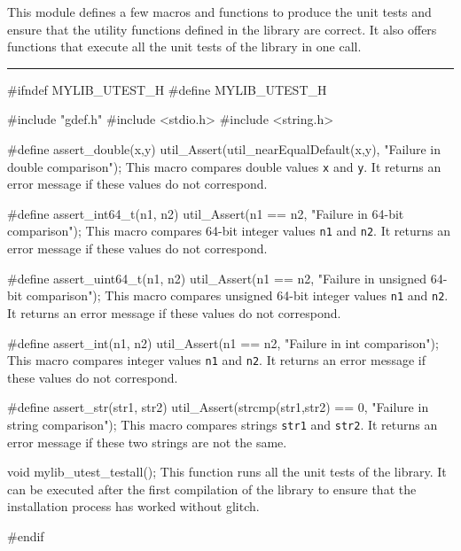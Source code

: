
This module defines a few macros and functions to produce the unit tests and ensure that the utility functions defined in the library are correct. It also offers functions that execute all the unit tests of the library in one call.

\bigskip
\hrule
\code
\hide
#ifndef MYLIB_UTEST_H
#define MYLIB_UTEST_H
\endhide

#include "gdef.h"
#include <stdio.h>
#include <string.h>

#define assert_double(x,y) util_Assert(util_nearEqualDefault(x,y), "Failure in double comparison");
\endcode
 \tab  This macro compares double values {\tt x} and {\tt y}.
  It returns an error message if these values do not correspond.
 \endtab
\code

#define assert_int64_t(n1, n2) util_Assert(n1 == n2, "Failure in 64-bit comparison");
\endcode
 \tab  This macro compares 64-bit integer values {\tt n1} and {\tt n2}.
  It returns an error message if these values do not correspond.
 \endtab
\code

#define assert_uint64_t(n1, n2) util_Assert(n1 == n2, "Failure in unsigned 64-bit comparison");
\endcode
 \tab  This macro compares unsigned 64-bit integer values {\tt n1} and {\tt n2}.
  It returns an error message if these values do not correspond.
 \endtab
\code

#define assert_int(n1, n2) util_Assert(n1 == n2, "Failure in int comparison");
\endcode
 \tab  This macro compares integer values {\tt n1} and {\tt n2}.
  It returns an error message if these values do not correspond.
 \endtab
\code

#define assert_str(str1, str2) util_Assert(strcmp(str1,str2) == 0, "Failure in string comparison");
\endcode
 \tab  This macro compares strings {\tt str1} and {\tt str2}.
  It returns an error message if these two strings are not the same.
 \endtab
\code

void mylib_utest_testall();
\endcode
 \tab  This function runs all the unit tests of the library. It can be executed after the first compilation of the library to ensure that the installation process has worked without glitch.
 \endtab
\code

\hide
#endif
\endhide
\endcode
